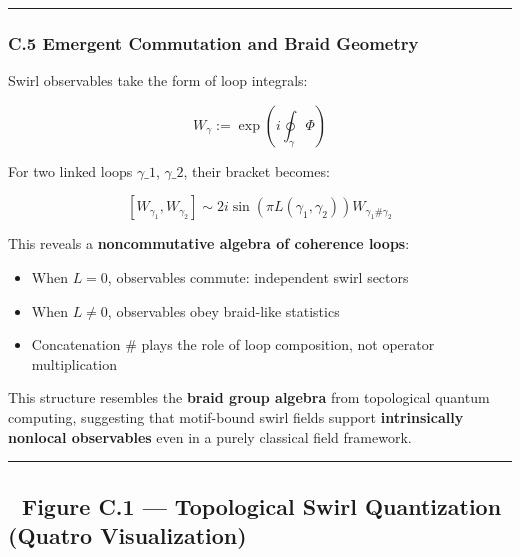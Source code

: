 \documentclass[
  11pt,
]{article}
\providecommand{\tightlist}{%
  \setlength{\itemsep}{0pt}\setlength{\parskip}{0pt}}
\begin{document}
\begin{center}\rule{0.5\linewidth}{0.5pt}\end{center}

\subsubsection{\texorpdfstring{\textbf{C.5 Emergent Commutation and
Braid
Geometry}}{C.5 Emergent Commutation and Braid Geometry}}\label{c.5-emergent-commutation-and-braid-geometry}

Swirl observables take the form of loop integrals:

\[
W_\gamma := \exp\left(i \oint_\gamma \Phi \right)
\]

For two linked loops \(\gamma\_1\), \(\gamma\_2\), their bracket
becomes:

\[
[W_{\gamma_1}, W_{\gamma_2}] \sim 2i \sin\left( \pi L(\gamma_1, \gamma_2) \right) W_{\gamma_1 \# \gamma_2}
\]

This reveals a \textbf{noncommutative algebra of coherence loops}:

\begin{itemize}
\tightlist
\item
  When \(L=0\), observables commute: independent swirl sectors
\item
  When \(L \ne 0\), observables obey braid-like statistics
\item
  Concatenation \(\#\) plays the role of loop composition, not operator
  multiplication
\end{itemize}

This structure resembles the \textbf{braid group algebra} from
topological quantum computing, suggesting that motif-bound swirl fields
support \textbf{intrinsically nonlocal observables} even in a purely
classical field framework.

\begin{center}\rule{0.5\linewidth}{0.5pt}\end{center}

\subsection{🔳 Figure C.1 --- Topological Swirl Quantization (Quatro
Visualization)}\label{figure-c.1-topological-swirl-quantization-quatro-visualization}
\end{document}
